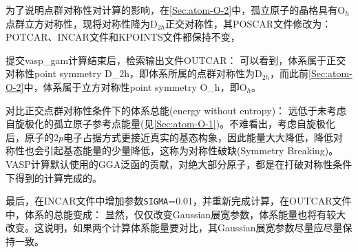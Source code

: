 为了说明点群对称性对计算的影响，在\ref{Sec:atom-O-2}中，孤立原子的晶格具有$\mathrm{O}_h$点群立方对称性，现将对称性降为$\mathrm{D}_{2h}$正交对称性，其\textrm{POSCAR}文件修改为：
{\fontsize{8.2pt}{6.2pt}\selectfont{
}}
\textrm{POTCAR}、\textrm{INCAR}文件和\textrm{KPOINTS}文件都保持不变，

提交\textrm{vasp\_gam}计算结束后，检索输出文件\textrm{OUTCAR}：
{\fontsize{8.2pt}{6.2pt}\selectfont{
}}
可以看到，体系属于正交对称性\textrm{point symmetry D\_2h}，即体系所属的点群对称性为$\mathrm{D}_{2h}$，而此前\ref{Sec:atom-O-2}中，体系属于立方对称性\textrm{point symmetry O\_h}，即$\mathrm{O}_h$。

对比正交点群对称性条件下的体系总能\textrm{(energy without entropy)}：
{\fontsize{8.2pt}{6.2pt}\selectfont{
}}
远低于未考虑自旋极化的孤立原子参考点能量(见\ref{Sec:atom-O-1})。不难看出，考虑自旋极化后，原子的$2p$电子占据方式更接近真实的基态构象，因此能量大大降低，降低对称性也会引起基态能量的少量降低，这称为对称性破缺\textrm{(Symmetry Breaking)}。\textrm{VASP}计算默认使用的\textrm{GGA}泛函的贡献，对绝大部分原子，都是在打破对称性条件下得到的计算完成的。

最后，在\textrm{INCAR}文件中增加参数\texttt{SIGMA}=0.01，并重新完成计算，在\textrm{OUTCAR}文件中，体系的总能变成：
{\fontsize{8.2pt}{6.2pt}\selectfont{
}}
显然，仅仅改变\textrm{Gaussian}展宽参数，体系能量也将有较大改变。这说明，如果两个计算体系能量要对比，其\textrm{Gaussian}展宽参数尽量应尽量保持一致。

